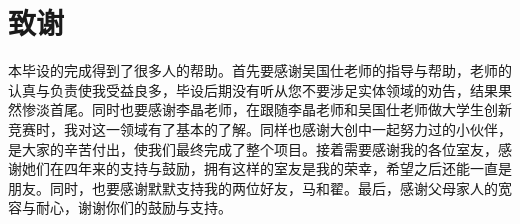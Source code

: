 \chapter*{致\qquad 谢}\thispagestyle{fancy}
\songti{} 

	本毕设的完成得到了很多人的帮助。首先要感谢吴国仕老师的指导与帮助，老师的认真与负责使我受益良多，毕设后期没有听从您不要涉足实体领域的劝告，结果果然惨淡首尾。同时也要感谢李晶老师，在跟随李晶老师和吴国仕老师做大学生创新竞赛时，我对这一领域有了基本的了解。同样也感谢大创中一起努力过的小伙伴，是大家的辛苦付出，使我们最终完成了整个项目。接着需要感谢我的各位室友，感谢她们在四年来的支持与鼓励，拥有这样的室友是我的荣幸，希望之后还能一直是朋友。同时，也要感谢默默支持我的两位好友，马和翟。最后，感谢父母家人的宽容与耐心，谢谢你们的鼓励与支持。

